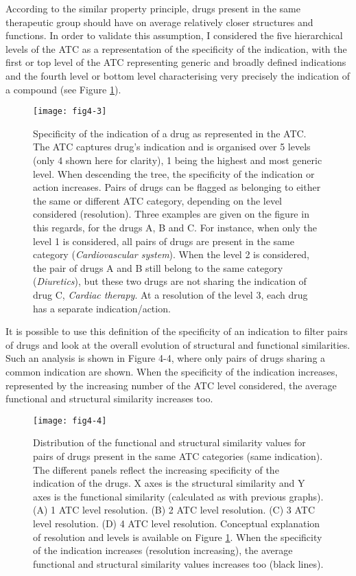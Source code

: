According to the similar property principle, drugs present in the same therapeutic group should have on average relatively closer structures and functions. In order to validate this assumption, I considered the five hierarchical levels of the ATC as a representation of the specificity of the indication, with the first or top level of the ATC representing generic and broadly defined indications and the fourth level or bottom level characterising very precisely the indication of a compound (see Figure \ref{fig4-3}).

\begin{figure}[H]
    \centering
    \texttt{[image: fig4-3]}
    \caption{Specificity of the indication of a drug as represented in the ATC. The ATC captures drug's indication and is organised over 5 levels (only 4 shown here for clarity), 1 being the highest and most generic level. When descending the tree, the specificity of the indication or action increases. Pairs of drugs can be flagged as belonging to either the same or different ATC category, depending on the level considered (resolution). Three examples are given on the figure in this regards, for the drugs A, B and C. For instance, when only the level 1 is considered, all pairs of drugs are present in the same category (\emph{Cardiovascular system}). When the level 2 is considered, the pair of drugs A and B still belong to the same category (\emph{Diuretics}), but these two drugs are not sharing the indication of drug C, \emph{Cardiac therapy}. At a resolution of the level 3, each drug has a separate indication/action.}
    \label{fig4-3}
\end{figure}

It is possible to use this definition of the specificity of an indication to filter pairs of drugs and look at the overall evolution of structural and functional similarities. Such an analysis is shown in Figure 4-4, where only pairs of drugs sharing a common indication are shown. When the specificity of the indication increases, represented by the increasing number of the ATC level considered, the average functional and structural similarity increases too.

\begin{figure}[H]
    \centering
    \texttt{[image: fig4-4]}
    \caption{Distribution of the functional and structural similarity values for pairs of drugs present in the same ATC categories (same indication). The different panels reflect the increasing specificity of the indication of the drugs. X axes is the structural similarity and Y axes is the functional similarity (calculated as with previous graphs). (A) 1 ATC level resolution. (B) 2 ATC level resolution. (C) 3 ATC level resolution. (D) 4 ATC level resolution. Conceptual explanation of resolution and levels is available on Figure \ref{fig4-3}. When the specificity of the indication increases (resolution increasing), the average functional and structural similarity values increases too (black lines).}
    \label{fig4-4}
\end{figure}

